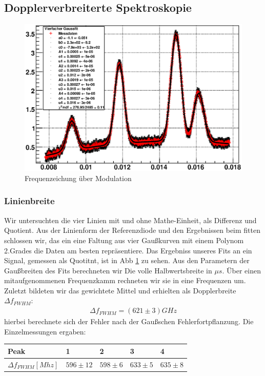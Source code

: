 \documentclass[12pt]{article}
\begin{document}
\subsection{Dopplerverbreiterte Spektroskopie}
\begin{figure}[H]
 \includegraphics[width=0.9\linewidth]{pictures/doppler.eps}
 \caption{Frequenzeichung über Modulation}
 \label{doppler}
\end{figure}
\subsubsection{Linienbreite}
Wir untersuchten die vier Linien mit und ohne Mathe-Einheit, als Differenz und Quotient. Aus der Linienform der Referenzdiode und den Ergebnissen beim fitten schlossen wir, das ein eine Faltung aus vier Gaußkurven mit einem Polynom 2.Grades die Daten am besten repräsentiere. Das Ergebniss unseres Fits an ein Signal, gemessen als Quotitnt, ist in Abb \ref{doppler} zu sehen. Aus den Parametern der Gaußbreiten des Fits berechneten wir Die volle Halbwertsbreite in $\mu s$. Über einen mitaufgenommenen Frequenzkamm rechneten wir sie in eine Frequenzen um. Zuletzt bildeten wir das gewichtete Mittel und erhielten als Dopplerbreite $\Delta f_{FWHM}$:
\begin{align*}
 \Delta f_{FWHM} = (621 \pm 3) GHz
\end{align*}
hierbei berechnete sich der Fehler nach der Gaußschen Fehlerfortpflanzung. Die Einzelmessungen ergaben:
\begin{center}
\begin{tabular}{|l|l|l|l|l|}
\hline
Peak & 1 & 2 & 3 & 4\\
\hline
$\Delta f_{FWHM} [Mhz]$ & $596\pm12$ & $598 \pm 6$ & $633 \pm 5$ & $635 \pm 8$\\
\hline
\end{tabular}
\end{center}
\end{document}
